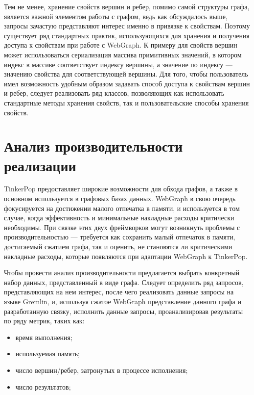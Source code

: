 \documentclass[times,specification,annotation]{itmo-student-thesis}
\begin{document}
Тем не менее, хранение свойств вершин и ребер, помимо самой структуры графа, является важной элементом работы с графом, ведь как обсуждалось выше, запросы зачастую представляют интерес именно в привязке к свойствам. Поэтому существует ряд стандартных практик, использующихся для хранения и получения доступа к свойствам при работе с WebGraph.
К примеру для свойств вершин может использоваться сериализация массива примитивных значений, в котором индекс в массиве соответствует индексу вершины, а значение по индексу --- значению свойства для соответствующей вершины. Для того, чтобы пользователь имел возможность удобным образом задавать способ доступа к свойствам вершин и ребер, следует реализовать ряд классов, позволяющих как использовать стандартные методы хранения свойств, так и пользовательские способы хранения свойств.

\section{Анализ производительности реализации}

TinkerPop предоставляет широкие возможности для обхода графов, а также в основном используется в графовых базах данных. WebGraph в свою очередь фокусируется на достижении малого отпечатка в памяти, и используется в том случае, когда эффективность и минимальные накладные расходы критически необходимы.
При связке этих двух фреймворков могут возникнуть проблемы с производительностью --- требуется как сохранить малый отпечаток в памяти, достигаемый сжатием графа, так и оценить, не становятся ли критическими накладные расходы, которые появляются при адаптации WebGraph к TinkerPop.

Чтобы провести анализ производительности предлагается выбрать конкретный набор данных, представленный в виде графа. Следует определить ряд запросов, представляющих на нем интерес, после чего реализовать данные запросы на языке Gremlin, и, используя сжатое WebGraph представление данного графа и разработанную связку, исполнить данные запросы, проанализировав результаты по ряду метрик, таких как:

\begin{itemize}
    \item время выполнения;
    \item используемая память;
    \item число вершин/ребер, затронутых в процессе исполнения;
    \item число результатов;
\end{itemize}
\end{document}
